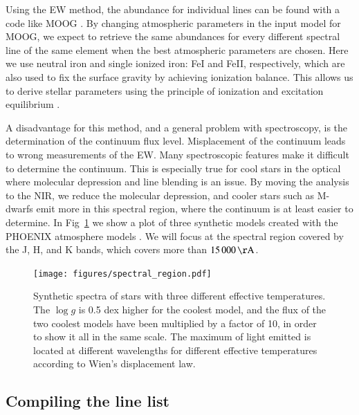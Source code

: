\documentclass{aa}
\begin{document}
Using the EW method, the abundance for individual lines can be found
with a code like MOOG \citep{Sneden1973}. By changing atmospheric
parameters in the input model for MOOG, we expect to retrieve the same
abundances for every different spectral line of the same element when
the best atmospheric parameters are chosen. Here we use neutral iron and
single ionized iron: FeI and FeII, respectively, which are also used to
fix the surface gravity by achieving ionization balance. This allows
us to derive stellar parameters using the principle of ionization and
excitation equilibrium \citep{Gray2006}.

A disadvantage for this method, and a general problem with spectroscopy,
is the determination of the continuum flux level. Misplacement of the
continuum leads to wrong measurements of the EW. Many spectroscopic
features make it difficult to determine the continuum. This is
especially true for cool stars in the optical where molecular depression
and line blending is an issue. By moving the analysis to the NIR, we
reduce the molecular depression, and cooler stars such as M-dwarfs
emit more in this spectral region, where the continuum is at least
easier to determine. In Fig~\ref{fig:spectral_region} we show a plot
of three synthetic models created with the PHOENIX atmosphere models
\citep{Husser2013}. We will focus at the spectral region covered by the
J, H, and K bands, which covers more than $\SI{15000}{\AA}$.

\begin{figure}[tbp!]
    \centering
    \texttt{[image: figures/spectral\_region.pdf]}
    \caption{Synthetic spectra of stars with three different effective
    temperatures. The $\log g$ is 0.5 dex higher for the coolest model,
    and the flux of the two coolest models have been multiplied by a
    factor of 10, in order to show it all in the same scale. The maximum
    of light emitted is located at different wavelengths for different
    effective temperatures according to Wien's displacement law.}
    \label{fig:spectral_region}
\end{figure}




\subsection{Compiling the line list}
\end{document}
